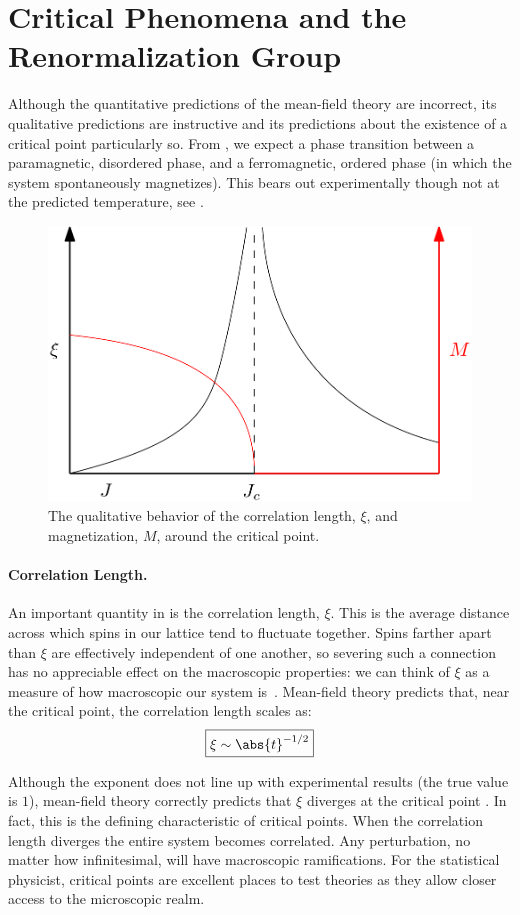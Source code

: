 \section{Critical Phenomena and the Renormalization
  Group}\label{sec:crit-phenomena}
Although the quantitative predictions of the mean-field theory are
incorrect, its qualitative predictions are instructive and its
predictions about the existence of a critical point particularly
so. From , we expect a phase transition
between a paramagnetic, disordered phase, and a ferromagnetic, ordered
phase (in which the system spontaneously magnetizes). This bears out
experimentally though not at the predicted temperature, see
.

\begin{figure}[ht]
  \centering
  \includegraphics[width=.5\textwidth]{figures/correlation-length.png}
  \caption{The qualitative behavior of the correlation length, $\xi$,
    and magnetization, $M$, around the critical
    point.\label{fig:crit-exponents} }
\end{figure}

\paragraph{Correlation Length.} An important quantity in
 is the correlation length, $\xi$. This is
the average distance across which spins in our lattice tend to
fluctuate together. Spins farther apart than $\xi$ are effectively
independent of one another, so severing such a connection has no
appreciable effect on the macroscopic properties: we can think of
$\xi$ as a measure of how macroscopic our system
is~\cite{cardy}. Mean-field theory predicts that, near the critical
point, the correlation length scales as:%
\begin{equation}%
  \boxed{\xi\sim \abs{t}^{-1/2}}\label{eq:mft-correlation-length}
\end{equation}%

Although the exponent does not line up with experimental results (the
true value is $1$), mean-field theory correctly predicts that $\xi$
diverges at the critical point . In fact,
this is the defining characteristic of critical points. When the
correlation length diverges the entire system becomes correlated. Any
perturbation, no matter how infinitesimal, will have macroscopic
ramifications. For the statistical physicist, critical points are
excellent places to test theories as they allow closer access to the
microscopic realm.

